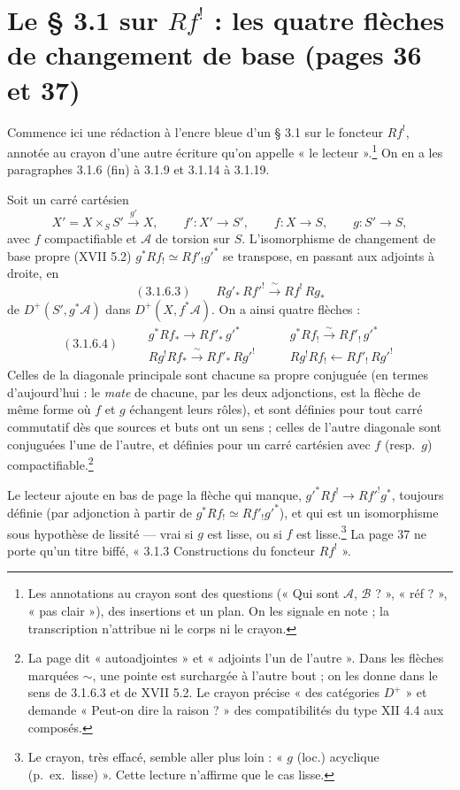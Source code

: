 \documentclass[11pt,a4paper]{article}
\begin{document}
\section*{Le § 3.1 sur $Rf^!$ : les quatre flèches de changement de base (pages 36 et 37)}

Commence ici une rédaction à l'encre bleue d'un § 3.1 sur le foncteur $Rf^!$,
annotée au crayon d'une autre écriture qu'on appelle « le lecteur ».\footnote{Les
annotations au crayon sont des questions (« Qui sont $\mathcal{A}$,
$\mathcal{B}$ ? », « réf ? », « pas clair »), des insertions et un plan. On
les signale en note ; la transcription n'attribue ni le corps ni le crayon.}
On en a les paragraphes 3.1.6 (fin) à 3.1.9 et 3.1.14 à 3.1.19.

Soit un carré cartésien
\[
X' = X \times_S S' \xrightarrow{\ g'\ } X, \qquad f'\colon X' \to S', \qquad
f\colon X \to S, \qquad g\colon S' \to S,
\]
avec $f$ compactifiable et $\mathcal{A}$ de torsion sur $S$. L'isomorphisme
de changement de base propre (XVII 5.2) $g^*Rf_! \simeq Rf'_!g'^*$ se
transpose, en passant aux adjoints à droite, en
\[
(3.1.6.3)\qquad Rg'_*\,Rf'^! \xrightarrow{\ \sim\ } Rf^!\,Rg_*
\]
de $D^+(S', g^*\mathcal{A})$ dans $D^+(X, f^*\mathcal{A})$. On a ainsi quatre
flèches :
\[
(3.1.6.4)\qquad
\begin{array}{ll}
g^*Rf_* \longrightarrow Rf'_*\,g'^* & \qquad g^*Rf_! \xrightarrow{\ \sim\ } Rf'_!\,g'^* \\[1ex]
Rg^!Rf_* \xrightarrow{\ \sim\ } Rf'_*\,Rg'^! & \qquad Rg^!Rf_! \longleftarrow Rf'_!\,Rg'^!
\end{array}
\]
Celles de la diagonale principale sont chacune sa propre conjuguée (en
termes d'aujourd'hui : le \emph{mate} de chacune, par les deux adjonctions,
est la flèche de même forme où $f$ et $g$ échangent leurs rôles), et sont
définies pour tout carré commutatif dès que sources et buts ont un sens ;
celles de l'autre diagonale sont conjuguées l'une de l'autre, et définies pour
un carré cartésien avec $f$ (resp.\ $g$) compactifiable.\footnote{La page dit
« autoadjointes » et « adjoints l'un de l'autre ». Dans les flèches marquées
$\sim$, une pointe est surchargée à l'autre bout ; on les donne dans le sens
de 3.1.6.3 et de XVII 5.2. Le crayon précise « des catégories $D^+$ » et
demande « Peut-on dire la raison ? » des compatibilités du type XII 4.4 aux
composés.}

Le lecteur ajoute en bas de page la flèche qui manque, $g'^*Rf^! \to
Rf'^!g^*$, toujours définie (par adjonction à partir de $g^*Rf_! \simeq
Rf'_!g'^*$), et qui est un isomorphisme sous hypothèse de lissité --- vrai si
$g$ est lisse, ou si $f$ est lisse.\footnote{Le crayon, très effacé, semble
aller plus loin : « $g$ (loc.) acyclique (p.\ ex.\ lisse) ». Cette lecture
n'affirme que le cas lisse.} La page 37 ne porte qu'un titre biffé,
« 3.1.3 Constructions du foncteur $Rf^!$ ».
\end{document}
